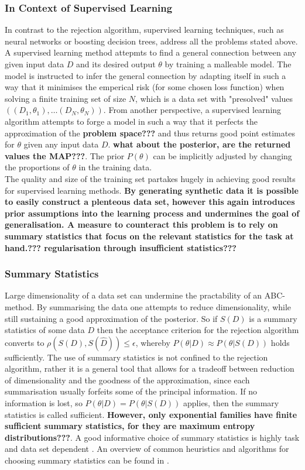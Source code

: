 \documentclass[a4paper, 11pt]{article}
\begin{document}
\subsubsection{In Context of Supervised Learning}
In contrast to the rejection algorithm, supervised learning techniques, such as neural networks or boosting decision trees, address all the problems stated above. A supervised learning method attepmts to find a general connection between any given input data $D$ and its desired output $\theta$ by training a malleable model. The model is instructed to infer the general connection by adapting itself in such a way that it minimises the emperical risk (for some chosen loss function) when solving a finite training set of size $N$, which is a data set with "presolved" values $((D_1,\theta_1),\ldots (D_N,\theta_N))$. From another perspective, a supervised learning algorithm attempts to forge a model in such a way that it perfects the approximation of the \textbf{problem space???} and thus returns good point estimates for $\theta$ given any input data $D$. \textbf{what about the posterior, are the returned values the MAP???}. The prior $P(\theta)$ can be implicitly adjusted by changing the proportions of $\theta$ in the training data.\\
The quality and size of the training set partakes hugely in achieving good results for supervised learning methods. \textbf{By generating synthetic data it is possible to easily construct a plenteous data set, however this again introduces prior assumptions into the learning process and undermines the goal of generalisation. A measure to counteract this problem is to rely on summary statistics that focus on the relevant statistics for the task at hand.??? regularisation through insufficient statistics???}

\subsubsection{Summary Statistics}
Large dimensionality of a data set can undermine the practability of an ABC-method. By summarising the data one attempts to reduce dimensionality, while still sustaining a good approximation of the posterior. So if $S(D)$ is a summary statistics of some data $D$ then the acceptance criterion for the rejection algorithm converts to $\rho(S(D), S(\hat{D})) \leq \epsilon$, whereby $P(\theta|D) \approx P(\theta|S(D))$ holds sufficiently. The use of summary statistics is not confined to the rejection algorithm, rather it is a general tool that allows for a tradeoff between reduction of dimensionality and the goodness of the approximation, since each summarisation usually forfeits some of the principal information. If no information is lost, so $P(\theta | D) = P(\theta| S(D))$ applies, then the summary statistics is called sufficient. \textbf{However, only exponential families have finite sufficient summary statistics, for they are maximum entropy distributions???}. A good informative choice of summary statistics is highly task and data set dependent \cite{nunes2010optimal}. An overview of common heuristics and algorithms for choosing summary statistics can be found in \cite{blum2013comparative}.
\end{document}
